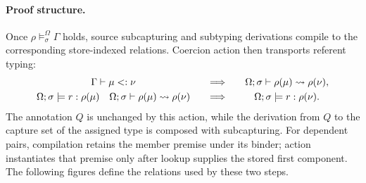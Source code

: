\documentclass[acmsmall,screen,nonacm]{acmart}
\begin{document}
\paragraph{Proof structure.}
Once \(\rho\models^\Omega_\sigma\Gamma\) holds, source subcapturing and
subtyping derivations compile to the corresponding store-indexed relations.
Coercion action then transports referent typing:
\[
\begin{array}{c@{\qquad}c@{\qquad}c}
 \Gamma\vdash\mu<:\nu
 &\Longrightarrow&
 \Omega;\sigma\vdash\rho(\mu)\coerce\rho(\nu),
 \\[3pt]
 \Omega;\sigma\models r:\rho(\mu)
 \quad
 \Omega;\sigma\vdash\rho(\mu)\coerce\rho(\nu)
 &\Longrightarrow&
 \Omega;\sigma\models r:\rho(\nu).
\end{array}
\]
The annotation \(Q\) is unchanged by this action, while the derivation from
\(Q\) to the capture set of the assigned type is composed with subcapturing.
For dependent pairs, compilation retains the member premise under its binder;
action instantiates that premise only after lookup supplies the stored first
component. The following figures define the relations used by these two
steps.

\clearpage
\begingroup
\setlength{\abovedisplayskip}{5pt plus 1pt minus 1pt}
\setlength{\belowdisplayskip}{5pt plus 1pt minus 1pt}
\setlength{\intextsep}{5pt}
\captionsetup{skip=6pt}
\end{document}
